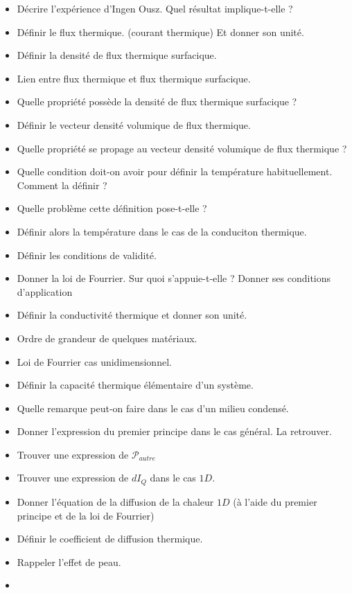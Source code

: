 \documentclass[a4paper, 11pt, hidelinks]{article}
\begin{document}
\begin{itemize}
    \item Décrire l'expérience d'Ingen Ousz. Quel résultat implique-t-elle ? \cite{Chapitre20} 
    \item Définir le flux thermique. (courant thermique) Et donner son unité. \cite{Chapitre20}
    \item Définir la densité de flux thermique surfacique. \cite{Chapitre20}
    \item Lien entre flux thermique et flux thermique surfacique. \cite{Chapitre20}
    \item Quelle propriété possède la densité de flux thermique surfacique ? \cite{Chapitre20}
    \item Définir le vecteur densité volumique de flux thermique. \cite{Chapitre20}
    \item Quelle propriété se propage au vecteur densité volumique de flux thermique ? \cite{Chapitre20}
    \item Quelle condition doit-on avoir pour définir la température habituellement. Comment la définir ? \cite{Chapitre20}
    \item Quelle problème cette définition pose-t-elle ? \cite{Chapitre20}
    \item Définir alors la température dans le cas de la conduciton thermique. \cite{Chapitre20}
    \item Définir les conditions de validité. \cite{Chapitre20}
    \item Donner la loi de Fourrier. Sur quoi s'appuie-t-elle ? Donner ses conditions d'application \cite{Chapitre20}
    \item Définir la conductivité thermique et donner son unité. \cite{Chapitre20}
    \item Ordre de grandeur de quelques matériaux. \cite{Chapitre20}
    \item Loi de Fourrier cas unidimensionnel. \cite{Chapitre20}
    \item Définir la capacité thermique élémentaire d'un système. \cite{Chapitre20}
    \item Quelle remarque peut-on faire dans le cas d'un milieu condensé. \cite{Chapitre20}
    \item Donner l'expression du premier principe dans le cas général. La retrouver. \cite{Chapitre20}
    \item Trouver une expression de $\mathscr{P}_{autre}$ \cite{Chapitre20}
    \item Trouver une expression de $dI_Q$ dans le cas $1D$. \cite{Chapitre20}
    \item Donner l'équation de la diffusion de la chaleur $1D$ (à l'aide du premier principe et de la loi de Fourrier) \cite{Chapitre20}
    \item Définir le coefficient de diffusion thermique. \cite{Chapitre20}
    \item Rappeler l'effet de peau. \cite{Chapitre20}
    \item 
\end{itemize}
\end{document}
